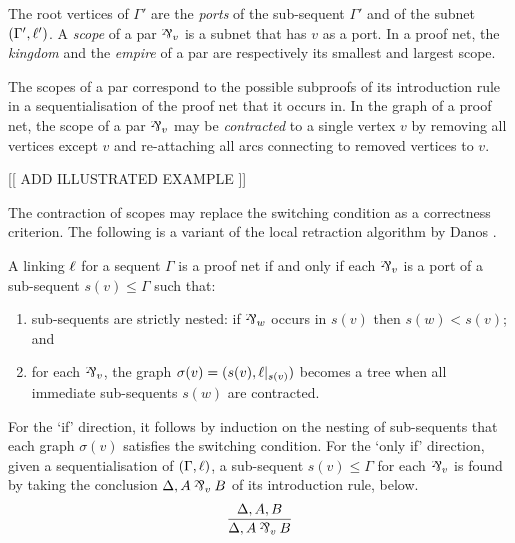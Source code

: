 \documentclass[conference,onecolumn]{IEEEtran}
\begin{document}
The root vertices of $\Gamma'$ are the \emph{ports} of the sub-sequent $\Gamma'$ and of the subnet $(\Gamma',\ell')$.
%
A \emph{scope} of a par $\named v\parr$ is a subnet that has $v$ as a port.
%
In a proof net, the \emph{kingdom} and the \emph{empire} of a par are respectively its smallest and largest scope.



The scopes of a par correspond to the possible subproofs of its introduction rule in a sequentialisation of the proof net that it occurs in.
%
In the graph of a proof net, the scope of a par $\named v\parr$ may be \emph{contracted} to a single vertex $v$ by removing all vertices except $v$ and re-attaching all arcs connecting to removed vertices to $v$.
%

[[ ADD ILLUSTRATED EXAMPLE ]]

%
The contraction of scopes may replace the switching condition as a correctness criterion.
%
The following is a variant of the local retraction algorithm by Danos \cite{Danos-1990}.


\begin{proposition}
\label{prop:scoping correctness}
A linking $\ell$ for a sequent $\Gamma$ is a proof net if and only if each $\named v\parr$ is a port of a sub-sequent $s(v)\leq\Gamma$ such that:

\begin{enumerate}
	\item
sub-sequents are strictly nested: if $\named w\parr$ occurs in $s(v)$ then $s(w)<s(v)$; and
	\item
for each $\named v\parr$, the graph $\sigma(v)=(s(v),\ell|_{s(v)})$ becomes a tree when all immediate sub-sequents $s(w)$ are contracted.
\end{enumerate}

\end{proposition}


\begin{IEEEproof}
For the `if' direction, it follows by induction on the nesting of sub-sequents that each graph $\sigma(v)$ satisfies the switching condition.
%
For the `only if' direction, given a sequentialisation of $(\Gamma,\ell)$, a sub-sequent $s(v)\leq\Gamma$ for each $\named v\parr$ is found by taking the conclusion $\Delta, A\named v\parr B$ of its introduction rule, below.
\[
	\infer{\Delta,A\named v\parr B}{\Delta,A,B}
\]
\end{IEEEproof}
\end{document}
